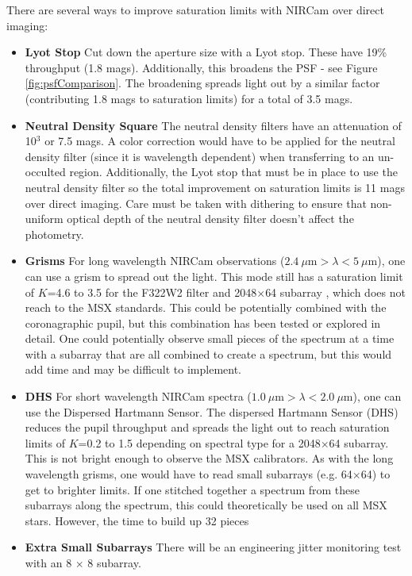 \documentclass{aastex6}
\begin{document}
There are several ways to improve saturation limits with NIRCam over direct imaging:
\begin{itemize}
\item \textbf{Lyot Stop} Cut down the aperture size with a Lyot stop. These have 19\% throughput (1.8 mags). Additionally, this broadens the PSF - see Figure \ref{fig:psfComparison}.
The broadening spreads light out by a similar factor (contributing 1.8 mags to saturation limits) for a total of 3.5 mags.
\item \textbf{Neutral Density Square} The neutral density filters have an attenuation of 10$^3$ or 7.5 mags. A color correction would have to be applied for the neutral density filter (since it is wavelength dependent) when transferring to an un-occulted region.
Additionally, the Lyot stop that must be in place to use the neutral density filter so the total improvement on saturation limits is 11 mags over direct imaging.
Care must be taken with dithering to ensure that non-uniform optical depth of the neutral density filter doesn't affect the photometry.
\item \textbf{Grisms} For long wavelength NIRCam observations ($2.4~\mu$m$ > \lambda < 5~\mu$m), one can use a grism to spread out the light. This mode still has a saturation limit of $K$=4.6 to 3.5 for the F322W2  filter and 2048$\times$64 subarray \citep{greene2016wfss}, which does not reach to the MSX standards. This could be potentially combined with the coronagraphic pupil, but this combination has been tested or explored in detail. One could potentially observe small pieces of the spectrum at a time with a subarray that are all combined to create a spectrum, but this would add time and may be difficult to implement.
\item \textbf{DHS} For short wavelength NIRCam spectra ($1.0~\mu$m$ > \lambda < 2.0~\mu$m), one can use the Dispersed Hartmann Sensor. The dispersed Hartmann Sensor (DHS) reduces the pupil throughput and spreads the light out to reach saturation limits of $K$=0.2 to 1.5 depending on spectral type \citep{schlawin2017dhs} for a 2048$\times$64 subarray.
This is not bright enough to observe the MSX calibrators.
As with the long wavelength grisms, one would have to read small subarrays (e.g. 64$\times$64) to get to brighter limits.
If one stitched together a spectrum from these subarrays along the spectrum, this could theoretically be used on all MSX stars.
However, the time to build up 32 pieces
\item \textbf{Extra Small Subarrays} There will be an engineering jitter monitoring test with an 8 $\times$ 8 subarray.

\end{itemize}
\end{document}
